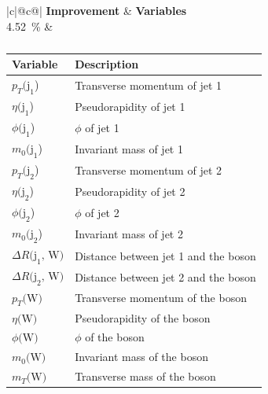 \begin{table}[h]
    \centering
    \label{tab:app_vars_4}
    \caption{}
    \begin{tabular}{ |c|@{}c@{}| }
        \hline
        \textbf{Improvement} & \textbf{Variables}\\
        \hline
        \SI{4.52}{\%} & 
        \begin{tabular}{ll}
            \hline
            Variable & Description\\
            \hline
            $p_T\text{(j}_\text{1}$) & Transverse momentum of jet 1\\
            $\eta\text{(j}_\text{1}$) & Pseudorapidity of jet 1\\
            $\phi\text{(j}_\text{1}$) & $\phi$ of jet 1\\
            $m_0\text{(j}_\text{1}$) & Invariant mass of jet 1\\

            $p_T\text{(j}_\text{2}$) & Transverse momentum of jet 2\\
            $\eta\text{(j}_\text{2}$) & Pseudorapidity of jet 2\\
            $\phi\text{(j}_\text{2}$) & $\phi$ of jet 2\\
            $m_0\text{(j}_\text{2}$) & Invariant mass of jet 2\\

            $\Delta R\text{(j}_\text{1}\text{, W)}$ & Distance between jet 1 and the \PW boson\\
            $\Delta R\text{(j}_\text{2}\text{, W)}$ & Distance between jet 2 and the \PW boson\\

            $p_T\text{(W)}$ & Transverse momentum of the \PW boson\\
            $\eta\text{(W)}$ & Pseudorapidity of the \PW boson\\
            $\phi\text{(W)}$ & $\phi$ of the \PW boson\\
            $m_0\text{(W)}$ & Invariant mass of the \PW boson\\
            $m_T\text{(W)}$ & Transverse mass of the \PW boson\\
            \hline
        \end{tabular}\\
        \hline
    \end{tabular}
\end{table}

